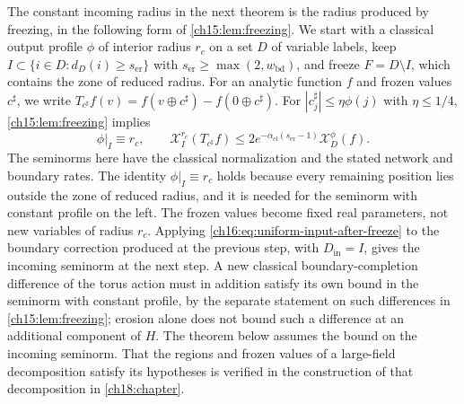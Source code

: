 The constant incoming radius in the next theorem is the radius produced by freezing, in the following form of \cref{ch15:lem:freezing}. We start with a classical output profile $\phi$ of interior radius $r_c$ on a set $D$ of variable labels, keep $I\subset\{i\in D:d_D(i)\ge s_{\mathrm{er}}\}$ with $s_{\mathrm{er}}\ge\max(2,w_{\mathrm{bd}})$, and freeze $F=D\setminus I$, which contains the zone of reduced radius. For an analytic function $f$ and frozen values $c^\sharp$, we write $T_{c^\sharp}f(v)=f(v\oplus c^\sharp)-f(0\oplus c^\sharp)$. For $|c_j^\sharp|\le\eta\phi(j)$ with $\eta\le1/4$, \cref{ch15:lem:freezing} implies
\begin{equation}\label{ch16:eq:uniform-input-after-freeze}
 \phi|_I\equiv r_c,\qquad
 \mathcal X_{I}^{r_c}(T_{c^\sharp}f)
   \le2e^{-\alpha_{\mathrm{cl}}(s_{\mathrm{er}}-1)}
                                      \mathcal X_D^\phi(f).
\end{equation}
The seminorms here have the classical normalization and the stated network and boundary rates. The identity $\phi|_I\equiv r_c$ holds because every remaining position lies outside the zone of reduced radius, and it is needed for the seminorm with constant profile on the left. The frozen values become fixed real parameters, not new variables of radius $r_c$. Applying \eqref{ch16:eq:uniform-input-after-freeze} to the boundary correction produced at the previous step, with $D_{\mathrm{in}}=I$, gives the incoming seminorm at the next step. A new classical boundary-completion difference of the torus action must in addition satisfy its own bound in the seminorm with constant profile, by the separate statement on such differences in \cref{ch15:lem:freezing}; erosion alone does not bound such a difference at an additional component of $H$. The theorem below assumes the bound on the incoming seminorm. That the regions and frozen values of a large-field decomposition satisfy its hypotheses is verified in the construction of that decomposition in \cref{ch18:chapter}.

